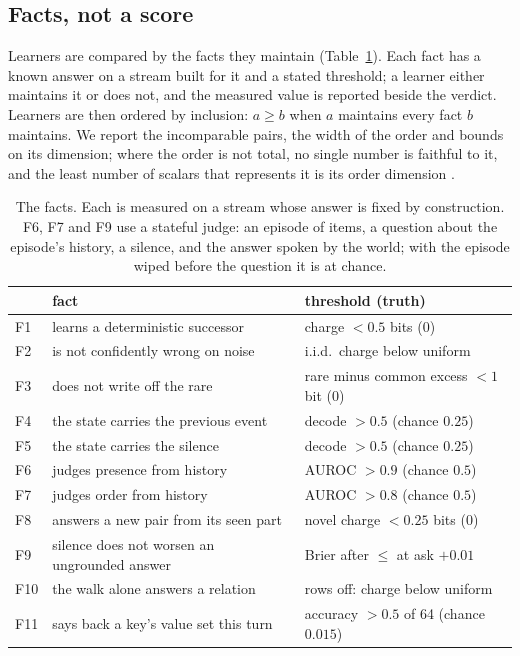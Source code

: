 \documentclass[11pt,a4paper]{article}
\theoremstyle{plain}
\theoremstyle{definition}
\theoremstyle{remark}
\begin{document}
\subsection{Facts, not a score}

Learners are compared by the facts they maintain (Table~\ref{tab:facts}). Each
fact has a known answer on a stream built for it and a stated threshold; a
learner either maintains it or does not, and the measured value is reported
beside the verdict. Learners are then ordered by inclusion: $a\geq b$ when $a$
maintains every fact $b$ maintains. We report the incomparable pairs, the width
of the order and bounds on its dimension; where the order is not total, no
single number is faithful to it, and the least number of scalars that represents
it is its order dimension \citep{dushnik1941partially,yang2026gluing}.

\begin{table}[h]
\centering
\small
\begin{tabular}{llp{5.6cm}}
\toprule
& fact & threshold (truth)\\
\midrule
F1 & learns a deterministic successor & charge $<0.5$ bits (0)\\
F2 & is not confidently wrong on noise & i.i.d.\ charge below uniform\\
F3 & does not write off the rare & rare minus common excess $<1$ bit (0)\\
F4 & the state carries the previous event & decode $>0.5$ (chance $0.25$)\\
F5 & the state carries the silence & decode $>0.5$ (chance $0.25$)\\
F6 & judges presence from history & AUROC $>0.9$ (chance $0.5$)\\
F7 & judges order from history & AUROC $>0.8$ (chance $0.5$)\\
F8 & answers a new pair from its seen part & novel charge $<0.25$ bits (0)\\
F9 & silence does not worsen an ungrounded answer & Brier after $\leq$ at ask $+0.01$\\
F10 & the walk alone answers a relation & rows off: charge below uniform\\
F11 & says back a key's value set this turn & accuracy $>0.5$ of 64 (chance $0.015$)\\
\bottomrule
\end{tabular}
\caption{The facts. Each is measured on a stream whose answer is fixed by
construction. F6, F7 and F9 use a stateful judge: an episode of items, a
question about the episode's history, a silence, and the answer spoken by the
world; with the episode wiped before the question it is at chance.}
\label{tab:facts}
\end{table}
\end{document}
